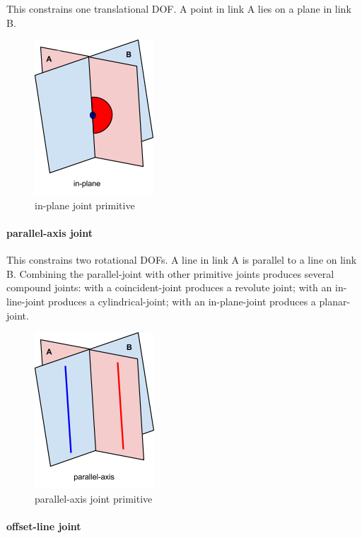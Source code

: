 \documentclass[]{report}
\begin{document}
This constrains one translational DOF. 
A point in link A lies on a plane in link B.

\begin{figure}[ht!]
	\centering
	\includegraphics[scale=0.7]{images/image15.png}
	\caption{in-plane joint primitive}
	\label{fig:in-plane-primitive}
\end{figure} 

\paragraph{parallel-axis joint}

This constrains two rotational DOFs. 
A line in link A is parallel to a line on link B. 
Combining the parallel-joint with other primitive joints produces several compound joints: 
with a coincident-joint produces a revolute joint; 
with an in-line-joint produces a cylindrical-joint; 
with an in-plane-joint produces a planar-joint.

\begin{figure}[ht!]
	\centering
	\includegraphics[scale=0.7]{images/image05.png}
	\caption{parallel-axis joint primitive}
	\label{fig:parallel-axis-primitive}
\end{figure}

\paragraph{offset-line joint}
\end{document}
